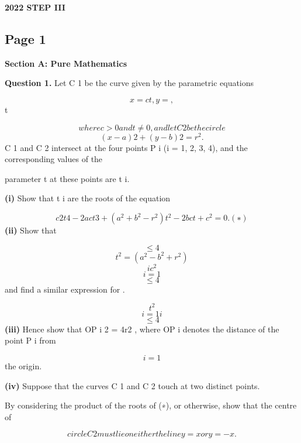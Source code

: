 \documentclass[12pt]{article}
\begin{document}
\begin{center}
{\Large \textbf{2022 STEP III}}
\end{center}

\subsection*{Page 1}
\begin{flushleft}
\bigskip\textbf{Section A: Pure Mathematics}\par
\bigskip\textbf{Question 1.} Let C 1 be the curve given by the parametric equations\par
\[x = ct , y = ,\]
t\par
\[where c > 0 and t \ne 0, and let C 2 be the circle\]
\[(x - a) 2 + (y - b) 2 = r^2 .\]
C 1 and C 2 intersect at the four points P i (i = 1, 2, 3, 4), and the corresponding values of the\par
parameter t at these points are t i.\par
\textbf{(i)} Show that t i are the roots of the equation\par
\[c2t4 - 2act3 + (a^2 + b^2 - r^2 )t^2 - 2bct + c^2 = 0 . (∗)\]
\textbf{(ii)} Show that\par
\[\leq4\]
\[t^2 = (a^2 - b^2 + r^2 )\]
\[i c^2\]
\[i=1\]
\[\leq4\]
and find a similar expression for .\par
\[t^2\]
\[i=1 i\]
\[\leq4\]
\textbf{(iii)} Hence show that OP i 2 = 4r2 , where OP i denotes the distance of the point P i from\par
\[i=1\]
the origin.\par
\textbf{(iv)} Suppose that the curves C 1 and C 2 touch at two distinct points.\par
By considering the product of the roots of (∗), or otherwise, show that the centre of\par
\[circle C 2 must lie on either the line y = x or y = -x.\]
\end{flushleft}
\end{document}
